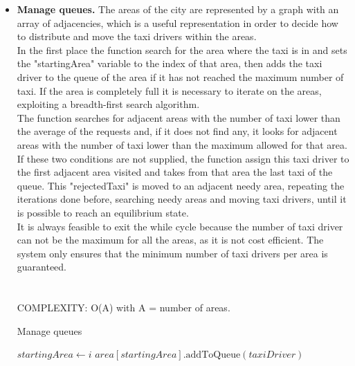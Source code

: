 \begin{itemize}
			\newpage
			\item \textbf{Manage queues.} The areas of the city are represented by a graph with an array of adjacencies, which is a useful representation in order to decide how to distribute and move the taxi drivers within the areas.\\
			In the first place the function search for the area where the taxi is in and sets the "startingArea" variable to the index of that area, then adds the taxi driver to the queue of the area if it has not reached the maximum number of taxi. If the area is completely full it is necessary to iterate on the areas, exploiting a breadth-first search algorithm.\\The function searches for adjacent areas with the number of taxi lower than the average of the requests and, if it does not find any, it looks for adjacent areas with the number of taxi lower than the maximum allowed for that area.\\ If these two conditions are not supplied, the function assign this taxi driver to the first adjacent area visited and takes from that area the last taxi of the queue. This "rejectedTaxi" is moved to an adjacent needy area, repeating the iterations done before, searching needy areas and moving taxi drivers, until it is possible to reach an equilibrium state.\\
			It is always feasible to exit the while cycle because the number of taxi driver can not be the maximum for all the areas, as it is not cost efficient. The system only ensures that the minimum number of taxi drivers per area is guaranteed.\\
			\\\\
			COMPLEXITY: O(A) with A = number of areas.
			
			
			\begin{algorithm}
				\caption{Manage queues}
				\begin{algorithmic}[1]
							\State $ startingArea \gets i $
						\EndIf
					\EndFor
						\State $ area[startingArea].\text{addToQueue}(taxiDriver)$
					

\end{algorithmic}
\end{algorithm}
\end{itemize}
